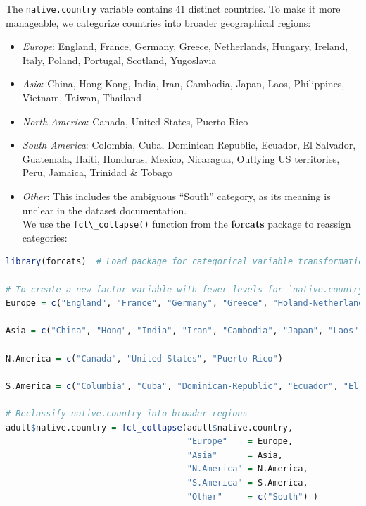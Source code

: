 \documentclass[
]{book}
\newcommand{\passthrough}[1]{#1}
\providecommand{\tightlist}{%
  \setlength{\itemsep}{0pt}\setlength{\parskip}{0pt}}
\theoremstyle{definition}
\theoremstyle{definition}
\theoremstyle{definition}
\theoremstyle{definition}
\theoremstyle{remark}
\begin{document}
The \passthrough{\lstinline!native.country!} variable contains 41 distinct countries. To make it more manageable, we categorize countries into broader geographical regions:

\begin{itemize}
\tightlist
\item
  \emph{Europe}: England, France, Germany, Greece, Netherlands, Hungary, Ireland, Italy, Poland, Portugal, Scotland, Yugoslavia\\
\item
  \emph{Asia}: China, Hong Kong, India, Iran, Cambodia, Japan, Laos, Philippines, Vietnam, Taiwan, Thailand\\
\item
  \emph{North America}: Canada, United States, Puerto Rico\\
\item
  \emph{South America}: Colombia, Cuba, Dominican Republic, Ecuador, El Salvador, Guatemala, Haiti, Honduras, Mexico, Nicaragua, Outlying US territories, Peru, Jamaica, Trinidad \& Tobago\\
\item
  \emph{Other}: This includes the ambiguous ``South'' category, as its meaning is unclear in the dataset documentation.\\
  We use the \passthrough{\lstinline!fct\_collapse()!} function from the \textbf{forcats} package to reassign categories:
\end{itemize}

\begin{lstlisting}[language=R]
library(forcats)  # Load package for categorical variable transformation

# To create a new factor variable with fewer levels for `native.country`
Europe = c("England", "France", "Germany", "Greece", "Holand-Netherlands", "Hungary", "Ireland", "Italy", "Poland", "Portugal", "Scotland", "Yugoslavia")

Asia = c("China", "Hong", "India", "Iran", "Cambodia", "Japan", "Laos", "Philippines", "Vietnam", "Taiwan", "Thailand")

N.America = c("Canada", "United-States", "Puerto-Rico")

S.America = c("Columbia", "Cuba", "Dominican-Republic", "Ecuador", "El-Salvador", "Guatemala", "Haiti", "Honduras", "Mexico", "Nicaragua", "Outlying-US(Guam-USVI-etc)", "Peru", "Jamaica", "Trinadad&Tobago")

# Reclassify native.country into broader regions
adult$native.country = fct_collapse(adult$native.country, 
                                    "Europe"    = Europe,
                                    "Asia"      = Asia,
                                    "N.America" = N.America,
                                    "S.America" = S.America,
                                    "Other"     = c("South") )
\end{lstlisting}
\end{document}
